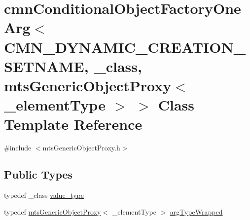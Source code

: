 \hypertarget{classcmn_conditional_object_factory_one_arg_3_01_c_m_n___d_y_n_a_m_i_c___c_r_e_a_t_i_o_n___s_e_tb8b7ba29a3cb16408b71ff50b31fc6ff}{}\section{cmn\+Conditional\+Object\+Factory\+One\+Arg$<$ C\+M\+N\+\_\+\+D\+Y\+N\+A\+M\+I\+C\+\_\+\+C\+R\+E\+A\+T\+I\+O\+N\+\_\+\+S\+E\+T\+N\+A\+M\+E, \+\_\+class, mts\+Generic\+Object\+Proxy$<$ \+\_\+element\+Type $>$ $>$ Class Template Reference}
\label{classcmn_conditional_object_factory_one_arg_3_01_c_m_n___d_y_n_a_m_i_c___c_r_e_a_t_i_o_n___s_e_tb8b7ba29a3cb16408b71ff50b31fc6ff}


{\ttfamily \#include $<$mts\+Generic\+Object\+Proxy.\+h$>$}

\subsection*{Public Types}
\begin{DoxyCompactItemize}
\item 
typedef \+\_\+class \hyperlink{classcmn_conditional_object_factory_one_arg_3_01_c_m_n___d_y_n_a_m_i_c___c_r_e_a_t_i_o_n___s_e_tb8b7ba29a3cb16408b71ff50b31fc6ff_a5babea558ca848257473a5b237abce37}{value\+\_\+type}
\item 
typedef \hyperlink{classmts_generic_object_proxy}{mts\+Generic\+Object\+Proxy}$<$ \+\_\+element\+Type $>$ \hyperlink{classcmn_conditional_object_factory_one_arg_3_01_c_m_n___d_y_n_a_m_i_c___c_r_e_a_t_i_o_n___s_e_tb8b7ba29a3cb16408b71ff50b31fc6ff_a07658f61563709ca6484e2313d1cfb8c}{arg\+Type\+Wrapped}
\end{DoxyCompactItemize}

